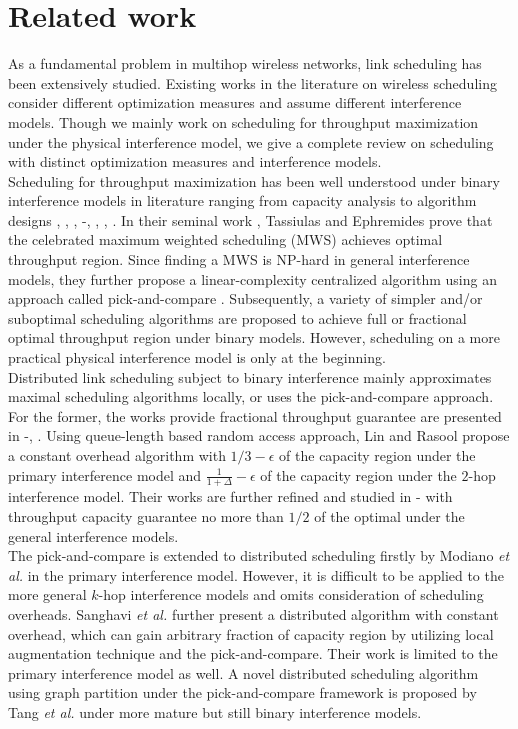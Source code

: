 \documentclass[journal]{IEEEtran}
\begin{document}
\section{Related work}
As a fundamental problem in multihop wireless networks, link scheduling has been extensively studied. Existing works in the literature on wireless scheduling consider different optimization measures and assume different interference models. Though we mainly work on scheduling for throughput maximization under the physical interference model, we give a complete review on scheduling with distinct optimization measures and interference models.\\
\indent Scheduling for throughput maximization has been well understood under binary interference models in literature ranging from capacity analysis  to  algorithm designs
\cite{S:pick1}, \cite{S:pick2}, \cite{S:pick3}, \cite{S:constant1}-\cite{S:constant4}, \cite{S:GMS}, \cite{S:MWM2}, \cite{S:MS}. In their seminal work \cite{S:MWM1}, Tassiulas and Ephremides prove that the celebrated maximum weighted scheduling (MWS) achieves optimal throughput region. Since finding a MWS is NP-hard in general interference models, they further propose a linear-complexity centralized algorithm using an approach called pick-and-compare \cite{S:MWM2}. Subsequently, a variety of simpler and/or suboptimal scheduling algorithms are proposed to achieve full or fractional optimal throughput region under binary models. However, scheduling on a more practical physical interference model is only at the beginning.\\
\indent Distributed link scheduling subject to binary interference mainly approximates maximal scheduling algorithms locally, or uses the pick-and-compare approach.\\
\indent For the former, the works provide fractional throughput guarantee are presented in \cite{S:constant1}-\cite{S:constant4}, \cite{S:MS}. Using queue-length based random access approach, Lin and Rasool \cite{S:constant1} propose a constant overhead algorithm with $1/3-\epsilon$  of the capacity region under the primary interference model and   $\frac{1}{1+\Delta}-\epsilon$ of the capacity region under the $2$-hop interference model. Their works are further refined and studied in \cite{S:constant2}-\cite{S:constant4} with throughput capacity guarantee no more than $1/2$  of the optimal under the general interference models.\\
\indent The pick-and-compare is extended to distributed scheduling firstly by Modiano \emph{et al.} \cite{S:pick3} in the primary interference model. However, it is difficult to be applied to the more general $k$-hop interference models and omits consideration of scheduling overheads. Sanghavi \emph{et al.} \cite{S:pick1} further present a distributed algorithm with constant overhead, which can gain arbitrary fraction of capacity region by utilizing local augmentation technique and the pick-and-compare. Their work is limited to the primary interference model as well. A novel distributed scheduling  algorithm using graph partition under the pick-and-compare framework is proposed by Tang \emph{et al.} \cite{S:pick2} under more mature but still binary interference models.\\
\end{document}
